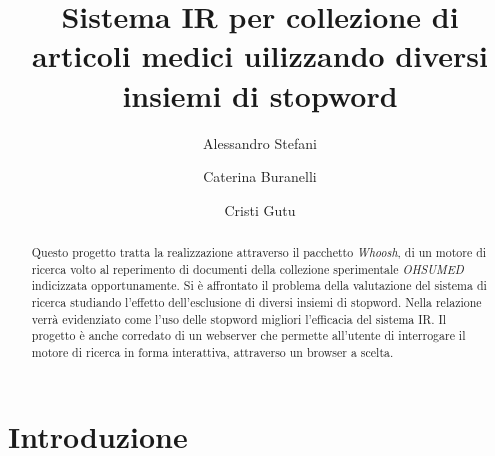\documentclass[runningheads]{llncs}
\begin{document}
%
\title{Sistema IR per collezione di articoli medici uilizzando diversi insiemi di stopword}
%
%
\author{%
  Alessandro Stefani \and
  Caterina Buranelli \and
  Cristi Gutu}
%
%
%
\maketitle
%
\begin{abstract}
Questo progetto tratta la realizzazione attraverso il pacchetto \emph{Whoosh}, di un motore di ricerca
volto al reperimento di documenti della collezione sperimentale \emph{OHSUMED} indicizzata opportunamente.
Si \`e affrontato il problema della valutazione del sistema di ricerca studiando l'effetto dell'esclusione
di diversi insiemi di stopword. Nella relazione verr\`a evidenziato come l'uso delle stopword migliori l'efficacia
del sistema IR.
Il progetto è anche corredato di un webserver che permette all'utente di interrogare il motore di ricerca
in forma interattiva, attraverso un browser a scelta.
\end{abstract}

\section{Introduzione}
\label{sec:introduzione}
\end{document}
